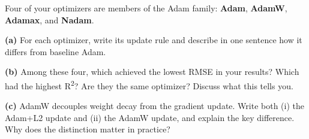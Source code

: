 \documentclass[12pt,a4paper]{article}
\begin{document}
\begin{tcolorbox}[colback=lightblue!40, colframe=myColorB,
  title={\textbf{Question 4 — The Adam Optimizer Family} \hfill \normalfont(15 pts)},
  fonttitle=\normalsize\bfseries, breakable]

Four of your optimizers are members of the Adam family: \textbf{Adam},
\textbf{AdamW}, \textbf{Adamax}, and \textbf{Nadam}.

\textbf{(a)} For each optimizer, write its update rule and describe in one sentence
how it differs from baseline Adam.

\textbf{(b)} Among these four, which achieved the lowest RMSE in your results?
Which had the highest R\textsuperscript{2}? Are they the same optimizer?
Discuss what this tells you.

\textbf{(c)} AdamW decouples weight decay from the gradient update.
Write both (i) the Adam+L2 update and (ii) the AdamW update, and explain the
key difference. Why does the distinction matter in practice?
\end{tcolorbox}
\end{document}
